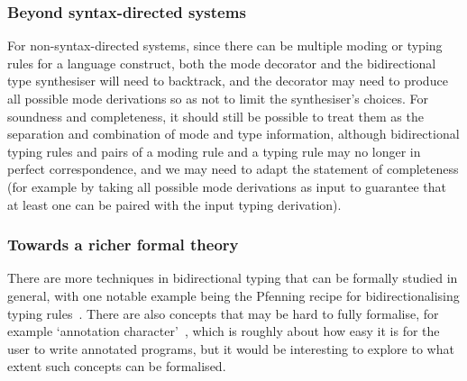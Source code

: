 \subsubsection{Beyond syntax-directed systems}

For non-syntax-directed systems, since there can be multiple moding or typing rules for a language construct, both the mode decorator and the bidirectional type synthesiser will need to backtrack, and the decorator may need to produce all possible mode derivations so as not to limit the synthesiser's choices.
For soundness and completeness, it should still be possible to treat them as the separation and combination of mode and type information, although bidirectional typing rules and pairs of a moding rule and a typing rule may no longer in perfect correspondence, and we may need to adapt the statement of completeness (for example by taking all possible mode derivations as input to guarantee that at least one can be paired with the input typing derivation).


\subsubsection{Towards a richer formal theory}

There are more techniques in bidirectional typing that can be formally studied in general, with one notable example being the Pfenning recipe for bidirectionalising typing rules~\citep[Section~4]{Dunfield2021}.
There are also concepts that may be hard to fully formalise, for example `annotation character'~\citep[Section~3.4]{Dunfield2021}, which is roughly about how easy it is for the user to write annotated programs, but it would be interesting to explore to what extent such concepts can be formalised.


